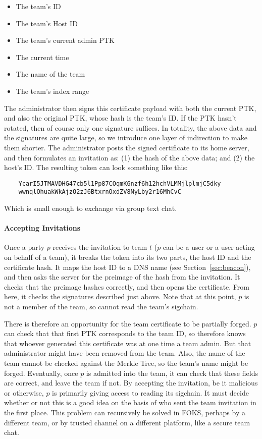 \begin{itemize}[noitemsep]
    \item The team's ID
    \item The team's Host ID
    \item The team's current admin PTK
    \item The current time
    \item The name of the team
    \item The team's index range
\end{itemize}
%
The administrator then signs this certificate payload with both the current PTK, 
and also the original PTK, whose hash is the team's ID.  If the PTK hasn't rotated,
then of course only one signature suffices. In totality, the above data and the signatures
are quite large, so we introduce one layer of indirection to make them shorter. 
The administrator posts the signed certificate to its home server, and then formulates
an invitation as: (1) the hash of the above data; and (2) the host's ID. The
resulting token can look something like this:
%
\begin{verbatim}
    YcarI5JTMAVDHG47cb5l1Pp87COqmK6nzf6h12hchVLMMjlplmjC5dky
    wwnqlOhuakWkAjzO2zJ6BtxrnOxdZV8NyLby2r16MhCvC
\end{verbatim}
% 
Which is small enough to exchange via group text chat.

\paragraph{Accepting Invitations}

Once a party $p$ receives the invitation to team $t$ ($p$ can be a user or a
user acting on behalf of a team), it breaks the token into its two parts, the
host ID and the certificate hash. It maps the host ID to a DNS name (see
Section~\ref{sec:beacon}), and then asks the server for the preimage of the hash
from the invitation. It checks that the preimage hashes correctly, and then
opens the certificate. From here, it checks the signatures described just above.
Note that at this point, $p$ is not a member of the team, so cannot read the
team's sigchain. 

There is therefore an opportunity for the team certificate to be partially
forged. $p$ can check that that first PTK corresponds to the team ID, so
therefore knows that whoever generated this certificate was at one time a team
admin.  But that administrator might have been removed from the team. Also, the
name of the team cannot be checked against the Merkle Tree, so the team's name
might be forged. Eventually, once $p$ is admitted into the team, it can check
that these fields are correct, and leave the team if not.  By accepting the
invitation, be it malicious or otherwise, $p$ is primarily giving access to
  reading its sigchain. It must decide whether or not this is a good idea on the
basis of who sent the team invitation in the first place. This problem can
recursively be solved in FOKS, perhaps by a different team, or by trusted
channel on a different platform, like a secure team chat.

